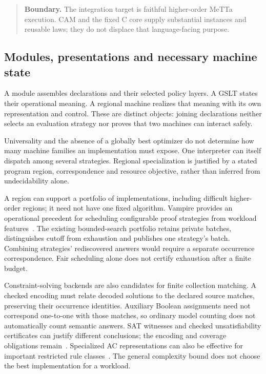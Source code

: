 \documentclass[11pt,a4paper]{article}
\newcommand{\scope}[1]{\par\smallskip\begin{quote}\small\textbf{Boundary.} #1\end{quote}}
\begin{document}
\scope{The integration target is faithful higher-order MeTTa execution.
CAM and the fixed C core supply substantial instances and reusable laws;
they do not displace that language-facing purpose.}

\newpage
\subsection{Modules, presentations and necessary machine state}

A module assembles declarations and their selected policy layers. A GSLT
states their operational meaning. A regional machine realizes that meaning
with its own representation and control. These are distinct objects: joining
declarations neither selects an evaluation strategy nor proves that two
machines can interact safely.

Universality and the absence of a globally best optimizer do not determine
how many machine families an implementation must expose. One interpreter can
itself dispatch among several strategies. Regional specialization is justified
by a stated program region, correspondence and resource objective, rather
than inferred from undecidability alone.

A region can support a portfolio of implementations, including difficult
higher-order regions; it need not have one fixed algorithm. Vampire provides
an operational precedent for scheduling configurable proof strategies from
workload features~\cite{DynamicStrategyPriority}. The existing bounded-search
portfolio retains private batches, distinguishes cutoff from exhaustion and
publishes one strategy's batch. Combining strategies' rediscovered answers
would require a separate occurrence correspondence. Fair scheduling alone
does not certify exhaustion after a finite budget.

Constraint-solving backends are also candidates for finite collection
matching. A checked encoding must relate decoded solutions to the declared
source matches, preserving their occurrence identities. Auxiliary Boolean
assignments need not correspond one-to-one with those matches, so ordinary
model counting does not automatically count semantic answers. SAT witnesses
and checked unsatisfiability certificates can justify different conclusions;
the encoding and coverage obligations remain~\cite{LRAT}. Specialized AC
representations can also be effective for important restricted rule
classes~\cite{EkerAC}. The general complexity bound does not choose the best
implementation for a workload.
\end{document}
